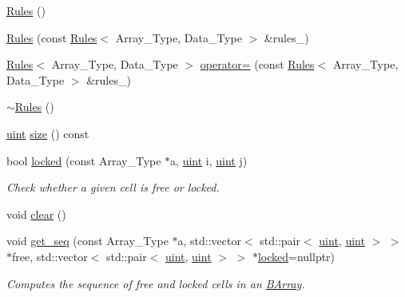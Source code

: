 \begin{DoxyCompactItemize}
\item 
\hyperlink{class_rules_aa78e9abf82ed8a0e4320d570191c8968}{Rules} ()
\item 
\hyperlink{class_rules_a57f5ab44febba391b2a06d163d25b237}{Rules} (const \hyperlink{class_rules}{Rules}$<$ Array\+\_\+\+Type, Data\+\_\+\+Type $>$ \&rules\+\_\+)
\item 
\hyperlink{class_rules}{Rules}$<$ Array\+\_\+\+Type, Data\+\_\+\+Type $>$ \hyperlink{class_rules_ab87544febb8301772164570708bd708e}{operator=} (const \hyperlink{class_rules}{Rules}$<$ Array\+\_\+\+Type, Data\+\_\+\+Type $>$ \&rules\+\_\+)
\item 
\hyperlink{class_rules_aa76d96c2316bc4a2a26bf4ec7b8d9463}{$\sim$\+Rules} ()
\item 
\hyperlink{typedefs_8hpp_a91ad9478d81a7aaf2593e8d9c3d06a14}{uint} \hyperlink{class_rules_a2f230f733e9936443af660bc890610ef}{size} () const
\item 
bool \hyperlink{class_rules_a4e08a6b3d8b536cb1717c62192a91537}{locked} (const Array\+\_\+\+Type $\ast$a, \hyperlink{typedefs_8hpp_a91ad9478d81a7aaf2593e8d9c3d06a14}{uint} i, \hyperlink{typedefs_8hpp_a91ad9478d81a7aaf2593e8d9c3d06a14}{uint} j)
\begin{DoxyCompactList}\small\item\em Check whether a given cell is free or locked. \end{DoxyCompactList}\item 
void \hyperlink{class_rules_a135a15d3ff70d4350d76a15f8e85f7df}{clear} ()
\item 
void \hyperlink{class_rules_a7b8f29955ec52f49808d7ea1cd4eaf5e}{get\+\_\+seq} (const Array\+\_\+\+Type $\ast$a, std\+::vector$<$ std\+::pair$<$ \hyperlink{typedefs_8hpp_a91ad9478d81a7aaf2593e8d9c3d06a14}{uint}, \hyperlink{typedefs_8hpp_a91ad9478d81a7aaf2593e8d9c3d06a14}{uint} $>$ $>$ $\ast$free, std\+::vector$<$ std\+::pair$<$ \hyperlink{typedefs_8hpp_a91ad9478d81a7aaf2593e8d9c3d06a14}{uint}, \hyperlink{typedefs_8hpp_a91ad9478d81a7aaf2593e8d9c3d06a14}{uint} $>$ $>$ $\ast$\hyperlink{class_rules_a4e08a6b3d8b536cb1717c62192a91537}{locked}=nullptr)
\begin{DoxyCompactList}\small\item\em Computes the sequence of free and locked cells in an \hyperlink{class_b_array}{B\+Array}. \end{DoxyCompactList}\end{DoxyCompactItemize}
